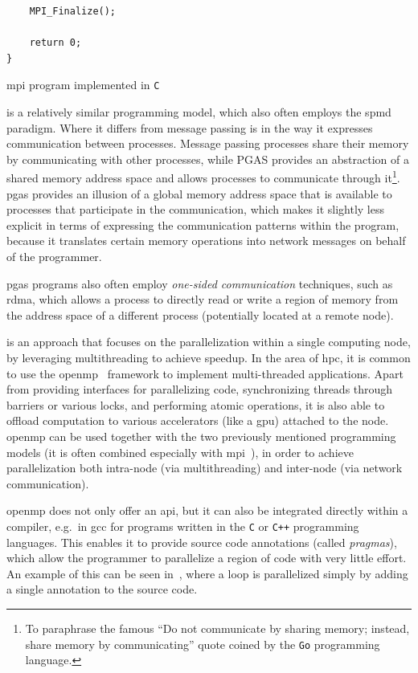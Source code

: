 \begin{description}[wide=0pt]
\begin{listing}[h]
\begin{verbatim}
	MPI_Finalize();

	return 0;
}
		  	\end{verbatim}
			\caption{\gls{mpi} program implemented in \texttt{C}}
			\label{lst:mpi-example}
		\end{listing}

	\item[\gls{pgas}~\cite{pgas}] is a relatively similar programming model, which also often employs the \gls{spmd}
		paradigm. Where it differs from message passing is in the way it expresses communication between
		processes. Message passing processes share their memory by communicating with other processes,
		while PGAS provides an abstraction of a shared memory address space and allows processes to
		communicate through it\footnote{To paraphrase the famous ``Do not communicate by sharing memory; instead, share memory by communicating'' quote coined by the \texttt{Go} programming language.}. \gls{pgas} provides an illusion of a
		global memory address space that is available to processes that participate in the communication,
		which makes it slightly less explicit in terms of expressing the communication patterns within the
		program, because it translates certain memory operations into network messages on behalf of the
		programmer.

		\gls{pgas} programs also often employ \emph{one-sided communication} techniques, such
		as \gls{rdma}, which allows a process to directly read or write a region of memory from
		the address space of a different process (potentially located at a remote node).

	\item[Shared-memory multiprocessing] is an approach that focuses on the parallelization within a single computing node, by leveraging
		multithreading to achieve speedup. In the area of \gls{hpc}, it is common to use the
		\gls{openmp}~\cite{openmp} framework to implement multi-threaded applications.
		Apart from providing interfaces for parallelizing code, synchronizing threads through barriers or
		various locks, and performing atomic operations, it is also able to offload computation to various
		accelerators (like a \gls{gpu}) attached to the node. \gls{openmp} can be
		used together with the two previously mentioned programming models (it is often combined especially
		with \gls{mpi}~\cite{hybrid_openmp_mpi}), in order to achieve parallelization both
		intra-node (via multithreading) and inter-node (via network communication).

		\gls{openmp} does not only offer an \gls{api}, but it can also be
		integrated directly within a compiler, e.g.\ in \gls{gcc} for programs written in the
		\texttt{C} or \texttt{C++} programming languages. This enables it to provide
		source code annotations (called \emph{pragmas}), which allow the programmer to parallelize
		a region of code with very little effort. An example of this can be seen in~,
		where a loop is parallelized simply by adding a single annotation to the source code.


\end{description}
